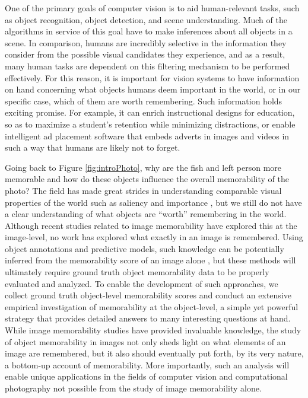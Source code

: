 One of the primary goals of computer vision is to aid human-relevant tasks, such as object recognition, object detection, and scene understanding. Much of the algorithms in service of this goal have to make inferences about all objects in a scene. In comparison, humans are incredibly selective in the information they consider from the possible visual candidates they experience, and as a result, many human tasks are dependent on this filtering mechanism to be performed effectively. For this reason, it is important for vision systems to have information on hand concerning what objects humans deem important in the world, or in our specific case, which of them are worth remembering. Such information holds exciting promise. For example, it can enrich instructional designs for education, so as to maximize a student's retention while minimizing distractions, or enable intelligent ad placement software that embeds adverts in images and videos in such a way that humans are likely not to forget.

Going back to Figure \ref{fig:introPhoto}, why are the fish and left person more memorable and how do these objects influence the overall memorability of the photo? The field has made great strides in understanding comparable visual  properties of the world such as saliency \cite{it} and importance \cite{berg12}, but we still do not have a clear understanding of what objects are ``worth” remembering in the world. Although recent studies related to image memorability \cite{isola11,isola11nips,khosla13,isola14,zoya15} have explored this at the image-level, no work has explored what exactly in an image is remembered. Using object annotations and predictive models, such knowledge can be potentially inferred from the memorability score of an image alone \cite{khosla12}, but these methods will ultimately require ground truth object memorability data to be properly evaluated and analyzed. To enable the development of such approaches, we collect ground truth object-level memorability scores and conduct an extensive empirical investigation of  memorability at the object-level, a simple yet powerful strategy that provides detailed answers to many interesting questions at hand. While image memorability studies have provided invaluable knowledge, the study of object memorability in images not only sheds light on what elements of an image are remembered, but it also should eventually put forth, by its very nature, a bottom-up account of memorability. More importantly, such an analysis will enable unique applications in the fields of computer vision and computational photography not possible from the study of image memorability alone.

